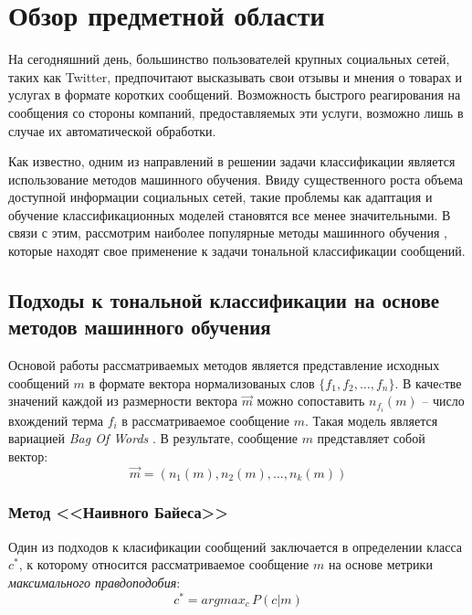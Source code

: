 \newpage
\section{Обзор предметной области}
    На сегодняшний день, большинство пользователей крупных социальных сетей,
    таких как Twitter, предпочитают высказывать свои отзывы и мнения о товарах
    и услугах в формате коротких сообщений. Возможность быстрого реагирования
    на сообщения со стороны компаний, предоставляемых эти услуги, возможно лишь
    в случае их автоматической обработки.

    Как известно, одним из направлений в решении задачи классификации является
    использование методов машинного обучения. Ввиду существенного роста объема
    доступной информации социальных сетей, такие проблемы как адаптация и
    обучение классификационных моделей становятся все менее значительными.
    В связи с этим, рассмотрим наиболее популярные методы машинного обучения \cite{svmAdvantages},
    которые находят свое применение к задачи тональной классификации сообщений.

    \subsection{Подходы к тональной классификации на основе методов машинного обучения}
        \label{sec:mlApproaches}
        Основой работы рассматриваемых методов является представление исходных
        сообщений $m$ в формате вектора нормализованых слов $\{f_1, f_2, \ldots, f_n\}$.
        В качеcтве значений каждой из размерности вектора $\vec{m}$ можно сопоставить
        $n_{f_i}(m)$ -- число вхождений терма $f_i$ в рассматриваемое сообщение $m$.
        Такая модель является вариацией {\it Bag Of Words} \cite{svmAdvantages}.
        В результате, сообщение $m$ представляет собой вектор:
        \begin{equation}
            \vec{m} = (n_1(m), n_2(m), \ldots, n_k(m)) \nonumber
        \end{equation}

        \subsubsection{Метод <<Наивного Байеса>>}
        Один из подходов к класификации сообщений заключается в определении класса $c^{*}$,
        к которому относится рассматриваемое сообщение $m$ на основе метрики
        {\it максимального правдоподобия}:
        \begin{equation}
            c^{*} = argmax_c \hspace{2pt} P(c|m) \nonumber
        \end{equation}

